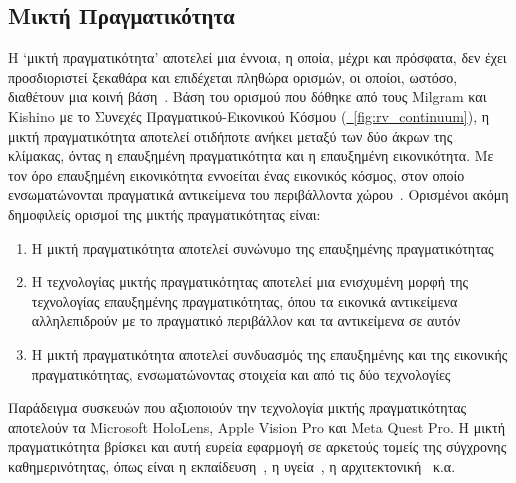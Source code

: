 \subsection{Μικτή Πραγματικότητα}\label{subsec:mixedReality}
Η `μικτή πραγματικότητα' αποτελεί μια έννοια, η οποία, μέχρι και πρόσφατα, δεν έχει προσδιοριστεί ξεκαθάρα και επιδέχεται πληθώρα ορισμών, οι οποίοι, ωστόσο, διαθέτουν μια κοινή βάση~\cite{speicher_2019_what}. Βάση του ορισμού που δόθηκε από τους Milgram και Kishino με το Συνεχές Πραγματικού-Εικονικού Κόσμου (\hyperref[fig:rv_continuum]{\schema~\ref*{fig:rv_continuum}}), η μικτή πραγματικότητα αποτελεί οτιδήποτε ανήκει μεταξύ των δύο άκρων της κλίμακας, όντας η επαυξημένη πραγματικότητα και η επαυξημένη εικονικότητα. Με τον όρο επαυξημένη εικονικότητα εννοείται ένας εικονικός κόσμος, στον οποίο ενσωματώνονται πραγματικά αντικείμενα του περιβάλλοντα χώρου~\cite{milgram_1994_augmented}. Ορισμένοι ακόμη δημοφιλείς ορισμοί της μικτής πραγματικότητας είναι:
\begin{enumerate}
    \item Η μικτή πραγματικότητα αποτελεί συνώνυμο της επαυξημένης πραγματικότητας
    \item Η τεχνολογίας μικτής πραγματικότητας αποτελεί μια ενισχυμένη μορφή της τεχνολογίας επαυξημένης πραγματικότητας, όπου τα εικονικά αντικείμενα αλληλεπιδρούν με το πραγματικό περιβάλλον και τα αντικείμενα σε αυτόν
    \item Η μικτή πραγματικότητα αποτελεί συνδυασμός της επαυξημένης και της εικονικής πραγματικότητας, ενσωματώνοντας στοιχεία και από τις δύο τεχνολογίες
\end{enumerate}
Παράδειγμα συσκευών που αξιοποιούν την τεχνολογία μικτής πραγματικότητας αποτελούν τα Microsoft HoloLens, Apple Vision Pro και Meta Quest Pro.
Η μικτή πραγματικότητα βρίσκει και αυτή ευρεία εφαρμογή σε αρκετούς τομείς της σύγχρονης καθημερινότητας, όπως είναι η εκπαίδευση~\cite{knierim_2018_challenges,liu_2007_mixed}, η υγεία~\cite{chen_2017_recent,tepper_2017_mixed}, η αρχιτεκτονική~\cite{wang_2008_mixed,dunston_2005_mixed} κ.α.